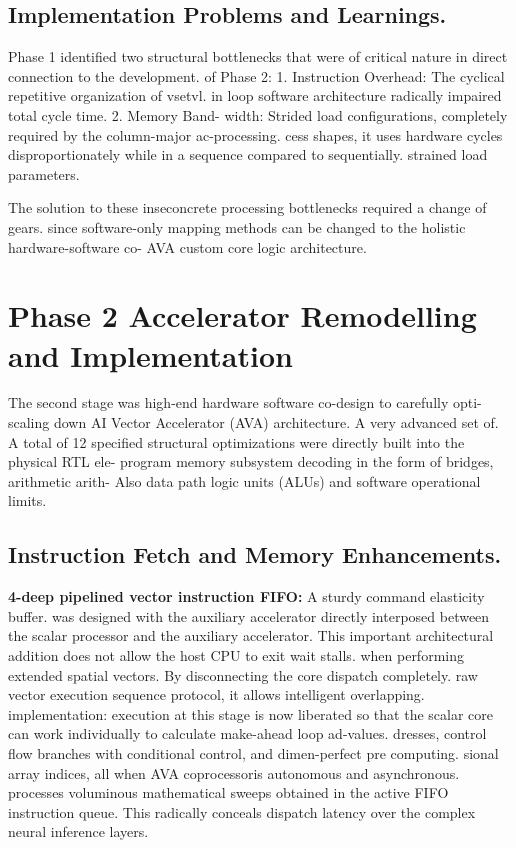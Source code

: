 \section{Implementation Problems and Learnings.}
Phase 1 identified two structural bottlenecks that were of critical nature in direct connection to the development. of Phase 2: 1. Instruction Overhead: The cyclical repetitive organization of vsetvl. in loop software architecture radically impaired total cycle time. 2. Memory Band- width: Strided load configurations, completely required by the column-major ac-processing. cess shapes, it uses hardware cycles disproportionately while in a sequence compared to sequentially. strained load parameters.

The solution to these inseconcrete processing bottlenecks required a change of gears. since software-only mapping methods can be changed to the holistic hardware-software co- AVA custom core logic architecture.

\chapter{Phase 2 Accelerator Remodelling and Implementation}
The second stage was high-end hardware software co-design to carefully opti- scaling down AI Vector Accelerator (AVA) architecture. A very advanced set of. A total of 12 specified structural optimizations were directly built into the physical RTL ele- program memory subsystem decoding in the form of bridges, arithmetic arith- Also data path logic units (ALUs) and software operational limits.

\section{Instruction Fetch and Memory Enhancements.}
\textbf{4-deep pipelined vector instruction FIFO:} A sturdy command elasticity buffer. was designed with the auxiliary accelerator directly interposed between the scalar processor and the auxiliary accelerator. This important architectural addition does not allow the host CPU to exit wait stalls. when performing extended spatial vectors. By disconnecting the core dispatch completely. raw vector execution sequence protocol, it allows intelligent overlapping. implementation: execution at this stage is now liberated so that the scalar core can work individually to calculate make-ahead loop ad-values. dresses, control flow branches with conditional control, and dimen-perfect pre computing. sional array indices, all when AVA coprocessoris autonomous and asynchronous. processes voluminous mathematical sweeps obtained in the active FIFO instruction queue. This radically conceals dispatch latency over the complex neural inference layers.

